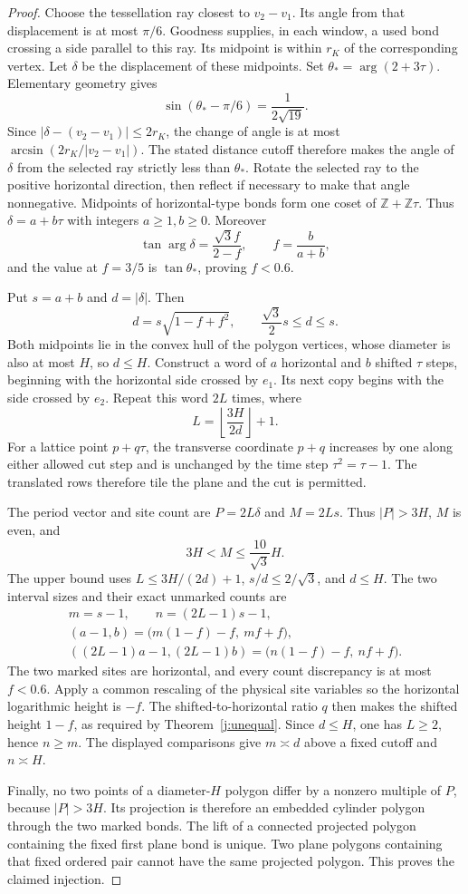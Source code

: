 \begin{proof}
Choose the tessellation ray closest to $v_2-v_1$. Its angle from that
displacement is at most $\pi/6$. Goodness supplies, in each window, a
used bond crossing a side parallel to this ray. Its midpoint is within
$r_K$ of the corresponding vertex. Let $\delta$ be the displacement
of these midpoints. Set $\theta_* =\arg(2+3\tau)$. Elementary geometry
gives
\[
 \sin(\theta_*-\pi/6)=\frac1{2\sqrt{19}}.
\]
Since $|\delta-(v_2-v_1)|\le2r_K$, the change of angle is at most
$\arcsin(2r_K/|v_2-v_1|)$. The stated distance cutoff therefore makes
the angle of $\delta$ from the selected ray strictly less than
$\theta_*$. Rotate the selected ray to the positive horizontal direction,
then reflect if necessary to make that angle nonnegative.
Midpoints of horizontal-type bonds form one coset of
$\mathbb Z+\mathbb Z\tau$. Thus $\delta=a+b\tau$ with integers
$a\ge1,b\ge0$. Moreover
\[
 \tan\arg\delta=\frac{\sqrt3 f}{2-f},\qquad f=\frac b{a+b},
\]
and the value at $f=3/5$ is $\tan\theta_*$, proving $f<0.6$.

Put $s=a+b$ and $d=|\delta|$. Then
\[
 d=s\sqrt{1-f+f^2},\qquad \frac{\sqrt3}{2}s\le d\le s.
\]
Both midpoints lie in the convex hull of the polygon vertices, whose
diameter is also at most $H$, so $d\le H$. Construct a word of
$a$ horizontal and $b$ shifted $\tau$ steps, beginning with the
horizontal side crossed by $e_1$. Its next copy begins with the side
crossed by $e_2$. Repeat this word $2L$ times, where
\[
 L=\left\lfloor\frac{3H}{2d}\right\rfloor+1.
\]
For a lattice point $p+q\tau$, the transverse coordinate $p+q$
increases by one along either allowed cut step and is unchanged by the
time step $\tau^2=\tau-1$. The translated rows therefore tile the
plane and the cut is permitted.

The period vector and site count are $P=2L\delta$ and $M=2Ls$.
Thus $|P|>3H$, $M$ is even, and
\[
 3H<M\le\frac{10}{\sqrt3}H.
\]
The upper bound uses $L\le3H/(2d)+1$, $s/d\le2/\sqrt3$, and $d\le H$.
The two interval sizes and their exact unmarked counts are
\[
\begin{gathered}
 m=s-1,\qquad n=(2L-1)s-1,\\
 (a-1,b)=\bigl(m(1-f)-f,\ mf+f\bigr),\\
 ((2L-1)a-1,(2L-1)b)
   =\bigl(n(1-f)-f,\ nf+f\bigr).
\end{gathered}
\]
The two marked sites are horizontal, and every count discrepancy is
at most $f<0.6$. Apply a common rescaling of the physical site variables
so the horizontal logarithmic height is $-f$. The shifted-to-horizontal
ratio $q$ then makes the shifted height $1-f$, as required by
Theorem~\ref{j:unequal}. Since $d\le H$, one has $L\ge2$, hence $n\ge m$.
The displayed comparisons give $m\asymp d$ above a fixed cutoff and
$n\asymp H$.

Finally, no two points of a diameter-$H$ polygon differ by a nonzero
multiple of $P$, because $|P|>3H$. Its projection is therefore an
embedded cylinder polygon through the two marked bonds. The lift of a
connected projected polygon containing the fixed first plane bond is
unique. Two plane polygons containing that fixed ordered pair cannot
have the same projected polygon. This proves the claimed injection.
\end{proof}

